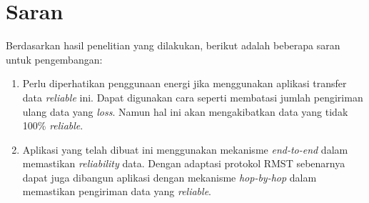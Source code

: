 \section{Saran}
\label{sec:saran}
Berdasarkan hasil penelitian yang dilakukan, berikut adalah beberapa saran untuk pengembangan:
\begin{enumerate}
    \item Perlu diperhatikan penggunaan energi jika menggunakan aplikasi transfer data \textit{reliable} ini. Dapat digunakan cara seperti membatasi jumlah pengiriman ulang data yang \textit{loss}. Namun hal ini akan mengakibatkan data yang tidak 100\% \textit{reliable}.
    \item Aplikasi yang telah dibuat ini menggunakan mekanisme \textit{end-to-end} dalam memastikan \textit{reliability} data. Dengan adaptasi protokol RMST sebenarnya dapat juga dibangun aplikasi dengan mekanisme \textit{hop-by-hop} dalam memastikan pengiriman data yang \textit{reliable}.
\end{enumerate}